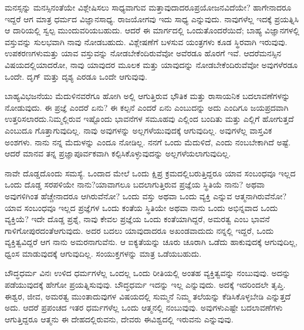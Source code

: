 \vskip 3pt

ಮನಸ್ಸನ್ನು ಮನಸ್ಸಿನಂತೆಯೇ ವಿಶ್ಲೇಷಿಸಲು ಸಾಧ್ಯವಾಗುವ ಮತ್ತಾವುದಾದರೂ\break ಪ್ರಯೋಜನವಿದೆಯೇ? ಹಾಗೇನಾದರೂ ಇದ್ದರೆ ಆಗ ಮಾತ್ರ ಧರ್ಮದ ವಿಜ್ಞಾನ\break ಸಾಧ್ಯ. ರಾಜಯೋಗವು ಇದು ಸಾಧ್ಯ ಎನ್ನುವುದು. ನಾವುಗಳೆಲ್ಲ ಇದಕ್ಕೆ ಪ್ರಯತ್ನಿಸಿ ಆ ದಾರಿಯಲ್ಲಿ ಸ್ವಲ್ಪ ಮುಂದುವರಿಯಬಹುದು. ಆದರೆ ಈ ಮಾರ್ಗದಲ್ಲಿ ಒಂದು\break ತೊಂದರೆಯಿದೆ; ಬಾಹ್ಯ ವಿಜ್ಞಾನಗಳಲ್ಲಿ ವಸ್ತುವನ್ನು ಸುಲಭವಾಗಿ ನಾವು ನೋಡಬಹುದು. ವಿಶ್ಲೇಷಣೆಗೆ ಬಳಸುವ ಯಂತ್ರಗಳು ಕೂಡ ಸ್ಥಿರವಾಗಿ ಇರುವುವು. ಉಪಕರಣಗಳು\break ಮತ್ತು ಯಾವ ವಸ್ತುವನ್ನು ನೋಡಬೇಕೆಂದಿರುವೆವೋ ಅವೆರಡೂ ಹೊರಗೆ ಇವೆ. ಆದರೆ\break ಮನಸ್ಸಿನ ವಿಷಯದಲ್ಲಿಯಾದರೋ, ನಾವು ಯಾವುದರ ಮೂಲಕ ಮತ್ತು ಯಾವುದನ್ನು ನೋಡಬೇಕೆಂದಿರುವೆವೋ ಅವುಗಳೆರಡೂ ಒಂದೇ. ದೃಗ್​ ಮತ್ತು ದೃಶ್ಯ ಎರಡೂ ಒಂದೇ ಆಗುವುವು.

\vskip 3pt

ಬಾಹ್ಯವಿಭಜನೆಯು ಮೆದುಳಿನವರೆಗೂ ಹೋಗಿ ಅಲ್ಲಿ ಆಗುತ್ತಿರುವ ಭೌತಿಕ ಮತ್ತು ರಾಸಾಯನಿಕ ಬದಲಾವಣೆಗಳನ್ನು ನೋಡುವುದು. ಈ ಪ್ರಜ್ಞೆ ಎಂದರೆ ಏನು? ಈ ಕಲ್ಪನೆ ಎಂದರೆ ಏನು ಎಂಬುದನ್ನು ಅದು ಎಂದಿಗೂ ಜಯಪ್ರದವಾಗಿ ಉತ್ತರಿಸಲಾರದು.\break ನಿಮ್ಮಲ್ಲಿರುವ ಇಷ್ಟೊಂದು ಭಾವನೆಗಳ ಸಮೂಹವು ಎಲ್ಲಿಂದ ಬಂದಿತು ಮತ್ತು ಎಲ್ಲಿಗೆ ಹೋಗುತ್ತದೆ ಎಂಬುದೂ ಗೊತ್ತಾಗುವುದಿಲ್ಲ. ನಾವು ಅವುಗಳನ್ನು ಅಲ್ಲಗಳೆಯುವುದಕ್ಕೆ ಆಗುವುದಿಲ್ಲ. ಅವುಗಳೆಲ್ಲ ವಾಸ್ತವಿಕ ಅಂಶಗಳು. ನಾನು ನನ್ನ ಮೆದುಳನ್ನು ಎಂದೂ ನೋಡಿಲ್ಲ. ನನಗೆ ಒಂದು ಮೆದುಳಿದೆ, ಎಂದು ನಂಬಬೇಕಾಗಿದೆ ಅಷ್ಟೆ. ಆದರೆ ಮಾನವ ತನ್ನ ಪ್ರಜ್ಞಾಪೂರ್ವಕವಾಗಿ ಕಲ್ಪಿಸಿಕೊಳ್ಳುವುದನ್ನು ಅಲ್ಲಗಳೆಯಲಾಗುವುದಿಲ್ಲ.

\vskip 3pt

ನಾವೇ ದೊಡ್ಡದೊಂದು ಸಮಸ್ಯೆ. ಒಂದಾದ ಮೇಲೆ ಒಂದು ಕ್ಷಿಪ್ರ ಕ್ರಮದಲ್ಲಿ\break ಬರುತ್ತಿದ್ದರೂ ಯಾವ ಸಂಬಂಧವೂ ಇಲ್ಲದ ಒಂದು ದೊಡ್ಡ ಸರಪಳಿಯೇ ನಾನು?\break ಯಾವಾಗಲೂ ಬದಲಾಗುತ್ತಿರುವ ಪ್ರಜ್ಞೆಯ ಸ್ಥಿತಿಯೆ ನಾನು? ಅಥವಾ ಅವುಗಳಿಗಿಂತ ಹೆಚ್ಚೇನಾದರೂ ಆಗಿರುವೆನೋ? ಒಂದು ವಸ್ತು ಅಥವಾ ಒಂದು ವ್ಯಕ್ತಿ ಎನ್ನುವ ಆತ್ಮನಾಗಿರು\-ವೆನೋ? ಯಾವ ಸಂಬಂಧವೂ ಇಲ್ಲದ ಪ್ರಜ್ಞೆಗಳ ಒಂದು ಕಂತೆಯ ಸ್ಥಿತಿಯೇ ಅಥವಾ ನಾನು ಒಂದು ಅಭಿನ್ನವಾದ ಒಂದು ವ್ಯಕ್ತಿಯೆ? ಇದೇ ದೊಡ್ಡ ಪ್ರಶ್ನೆ, ನಾವು ಕೇವಲ ಪ್ರಜ್ಞೆಯ ಒಂದು ಕಂತೆಯಾಗಿದ್ದರೆ, ಅಮರತ್ವ ಎಂಬ ಭಾವನೆ ಗಾಳಿಗೋಪುರದಂತೆ\break ಆಗುವುದು. ಅದರ ಬದಲು ಯಾವುದಾದರೂ ಅಖಂಡವಾದುದು ನನ್ನಲ್ಲಿ ಇದ್ದರೆ, ಒಂದು ವ್ಯಕ್ತಿತ್ವವಿದ್ದರೆ ಆಗ ನಾನು ಅಮರನಾಗುವೆನು. ಆ ಐಕ್ಯತೆಯನ್ನು ಚೂರು ಚೂರಾಗಿ ಒಡೆದು ಹಾಕುವುದಕ್ಕೆ ಆಗುವುದಿಲ್ಲ, ಧ್ವಂಸ ಮಾಡುವುದಕ್ಕೆ ಆಗುವುದಿಲ್ಲ. ಸಂಯುಕ್ತಗಳನ್ನು ಮಾತ್ರ ಒಡೆಯಬಹುದು.

\vskip 3pt

ಬೌದ್ಧಧರ್ಮ ವಿನಃ ಉಳಿದ ಧರ್ಮಗಳೆಲ್ಲ ಒಂದಲ್ಲ ಒಂದು ರೀತಿಯಲ್ಲಿ ಅಂತಹ ವ್ಯಕ್ತಿತ್ವವನ್ನು ನಂಬುವುವು. ಅದನ್ನು ಪಡೆಯುವುದಕ್ಕೆ ಹೇಗೋ ಪ್ರಯತ್ನಿಸುವುವು. ಬೌದ್ಧಧರ್ಮ ಇದನ್ನು ಇಲ್ಲ ಎನ್ನುವುದು. ಅದಕ್ಕೆ ಇದರಿಂದಲೇ ತೃಪ್ತಿ. ಈಶ್ವರ, ಜೀವ, ಅಮರತ್ವ ಮುಂತಾದುವುಗಳ ವಿಷಯದಲ್ಲಿ ಸುಮ್ಮನೆ ನಿಮ್ಮ ತಲೆಯನ್ನು ಕೆಡಿಸಿಕೊಳ್ಳಬೇಡಿ ಎನ್ನುತ್ತದೆ ಅದು. ಆದರೆ ಪ್ರಪಂಚದ ಇತರ ಧರ್ಮಗಳೆಲ್ಲ ಒಂದು ಆತ್ಮನಲ್ಲಿ ನಂಬುವುವು. ಅವುಗಳು\break ಎಷ್ಟೇ ಬದಲಾವಣೆಗಳು ಆಗುತ್ತಿದ್ದರೂ ಆತ್ಮನು ಈ ದೇಹದಲ್ಲಿರುವನು, ದೇವರು ಈ\break ವಿಶ್ವದಲ್ಲಿ ಇರುವನು ಎನ್ನುವುವು.

\vskip 3pt

